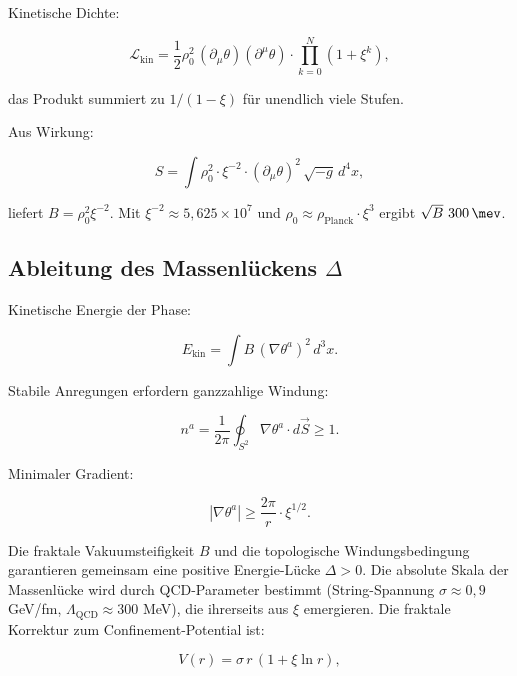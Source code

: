 	Kinetische Dichte:
	
	\begin{equation}
		\mathcal{L}_{\text{kin}} = \frac{1}{2} \rho_0^2 \, (\partial_\mu \theta) (\partial^\mu \theta) \cdot \prod_{k=0}^N (1 + \xi^k),
	\end{equation}
	
	das Produkt summiert zu \(1/(1-\xi)\) für unendlich viele Stufen.
	
	Aus Wirkung:
	
	\begin{equation}
		S = \int \rho_0^2 \cdot \xi^{-2} \cdot (\partial_\mu \theta)^2 \, \sqrt{-g} \, d^4x,
	\end{equation}
	
	liefert \(B = \rho_0^2 \xi^{-2}\). Mit \(\xi^{-2} \approx 5{,}625 \times 10^7\) und \(\rho_0 \approx \rho_{\text{Planck}} \cdot \xi^3\) ergibt \( \sqrt{B} \approx \SI{300}{\mev} \).
	
	\subsection*{Ableitung des Massenlückens \(\Delta\)}
	
	Kinetische Energie der Phase:
	
	\begin{equation}
		E_{\text{kin}} = \int B \, (\nabla \theta^a)^2 \, d^3x.
	\end{equation}
	
	Stabile Anregungen erfordern ganzzahlige Windung:
	
	\begin{equation}
		n^a = \frac{1}{2\pi} \oint_{S^2} \nabla \theta^a \cdot d\vec{S} \geq 1.
	\end{equation}
	
	Minimaler Gradient:
	
	\begin{equation}
		|\nabla \theta^a| \geq \frac{2\pi}{r} \cdot \xi^{1/2}.
	\end{equation}
	
	Die fraktale Vakuumsteifigkeit \(B\) und die topologische Windungsbedingung garantieren gemeinsam eine positive Energie-Lücke \(\Delta > 0\). Die absolute Skala der Massenlücke wird durch QCD-Parameter bestimmt (String-Spannung \(\sigma \approx 0{,}9\) GeV/fm, \(\Lambda_{\text{QCD}} \approx 300\) MeV), die ihrerseits aus \(\xi\) emergieren. Die fraktale Korrektur zum Confinement-Potential ist:
	
	\begin{equation}
		V(r) = \sigma \, r \, (1 + \xi \ln r),
	\end{equation}
	
